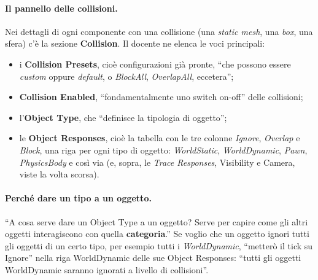 \paragraph{Il pannello delle collisioni.} Nei dettagli di ogni componente con una
collisione (una \emph{static mesh}, una \emph{box}, una sfera) c'è la sezione
\textbf{Collision}. Il docente ne elenca le voci principali:
\begin{itemize}
  \item i \textbf{Collision Presets}, cioè configurazioni già pronte, ``che possono
        essere \emph{custom} oppure \emph{default}, o \emph{BlockAll}, \emph{OverlapAll},
        eccetera'';
  \item \textbf{Collision Enabled}, ``fondamentalmente uno switch on-off'' delle
        collisioni;
  \item l'\textbf{Object Type}, che ``definisce la tipologia di oggetto'';
  \item le \textbf{Object Responses}, cioè la tabella con le tre colonne
        \emph{Ignore}, \emph{Overlap} e \emph{Block}, una riga per ogni tipo di oggetto:
        \emph{WorldStatic}, \emph{WorldDynamic}, \emph{Pawn}, \emph{PhysicsBody} e così
        via (e, sopra, le \emph{Trace Responses}, Visibility e Camera, viste la volta
        scorsa).
\end{itemize}

\paragraph{Perché dare un tipo a un oggetto.} ``A cosa serve dare un Object Type a un
oggetto? Serve per capire come gli altri oggetti interagiscono con quella
\textbf{categoria}.'' Se voglio che un oggetto ignori tutti gli oggetti di un certo
tipo, per esempio tutti i \emph{WorldDynamic}, ``metterò il tick su Ignore'' nella riga
WorldDynamic delle sue Object Responses: ``tutti gli oggetti WorldDynamic saranno
ignorati a livello di collisioni''.


